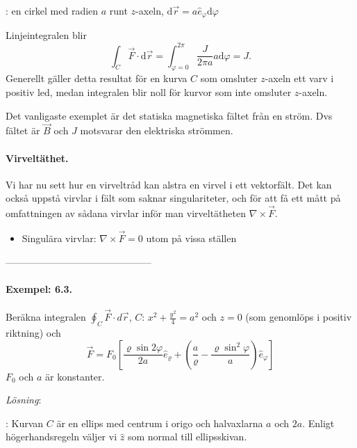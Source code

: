 \documentclass[%
oneside,                 %
final,                   %
10pt]{article}
\newcommand{\shortinlinecomment}[3]{{\color{red}{\bf #1}: #2}}
\newcommand{\longinlinecomment}[3]{{\color{red}{\bf #1}: #2}}
\begin{document}
\shortinlinecomment{Rita 6}{ en cirkel med radien $a$ runt $z$-axeln, $\mbox{d}\vec{r} = a \hat{e}_\varphi \mbox{d} \varphi$ }{ en cirkel med radien }

Linjeintegralen blir
\begin{equation}
\int_C\vec F\cdot \mbox{d}\vec r = \int_{\varphi=0}^{2\pi} \frac{J}{2 \pi a} a \mbox{d} \varphi = J.
\end{equation}
Generellt gäller detta resultat för en kurva $C$ som omsluter $z$-axeln ett varv i positiv led, medan integralen blir noll för kurvor som inte omsluter $z$-axeln. 

Det vanligaste exemplet är det statiska magnetiska fältet från en ström. Dvs fältet är $\vec{B}$ och $J$ motsvarar den elektriska strömmen.

\paragraph{Virveltäthet.}
Vi har nu sett hur en virveltråd kan alstra en virvel i ett vektorfält. Det kan också uppstå virvlar i fält som saknar singulariteter, och för att få ett mått på omfattningen av sådana virvlar inför man virveltätheten $\nabla \times \vec{F}$.

\begin{itemize}
\item Singulära virvlar: $\nabla \times \vec{F} = 0$ utom på vissa ställen 
\end{itemize}

\noindent
---------------------------------------------

\paragraph{Exempel: 6.3.}
Beräkna integralen $\oint_C \vec F \cdot d\vec{r}$, $C$: $x^2 + \frac{y^2}{4} = a^2$ och $z = 0$ (som genomlöps i positiv riktning) och 
\begin{equation}
  \vec F = F_0 \left[\frac{\varrho \sin 2\varphi}{2a} \hat{e}_\varrho
+ \left(\frac{a}{\varrho} - \frac{\varrho \sin^2 \varphi}{a}\right)\hat{e}_\varphi
\right]
\end{equation}
$F_0$ och $a$ är konstanter.

\emph{Lösning}:  

\longinlinecomment{Comment 7}{ Kurvan $C$ är en ellips med centrum i origo och halvaxlarna $a$ och $2a$. Enligt högerhandsregeln väljer vi $\hat z$ som normal till ellipsskivan. }{ Kurvan $C$ är en }
\end{document}
